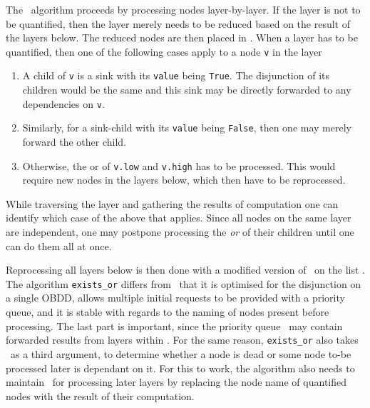 The \Exists\ algorithm proceeds by processing nodes layer-by-layer. If the layer
is not to be quantified, then the layer merely needs to be reduced based on the
result of the layers below. The reduced nodes are then placed in \ExistsLres.
When a layer has to be quantified, then one of the following cases apply to a
node \lstinline{v} in the layer

\begin{enumerate}
\item A child of \lstinline{v} is a sink with its \lstinline{value} being
  \lstinline{True}. The disjunction of its children would be the same and this
  sink may be directly forwarded to any dependencies on \lstinline{v}.

\item Similarly, for a sink-child with its \lstinline{value} being
  \lstinline{False}, then one may merely forward the other child.

\item Otherwise, the or of \lstinline{v.low} and \lstinline{v.high} has
  to be processed. This would require new nodes in the layers below, which
  then have to be reprocessed.
\end{enumerate}

While traversing the layer and gathering the results of computation one can
identify which case of the above that applies. Since all nodes on the same layer
are independent, one may postpone processing the \emph{or} of their children
until one can do them all at once.

Reprocessing all layers below is then done with a modified version of \Apply\ on
the list \ExistsLres. The algorithm \lstinline{exists_or} differs from \Apply\
that it is optimised for the disjunction on a single OBDD, allows multiple
initial requests to be provided with a priority queue, and it is stable with
regards to the naming of nodes present before processing. The last part is
important, since the priority queue \ExistsQdep\ may contain forwarded results
from layers within \ExistsLres. For the same reason, \lstinline{exists_or} also
takes \ExistsLforward\ as a third argument, to determine whether a node is dead
or some node to-be processed later is dependant on it. For this to work, the
algorithm also needs to maintain \ExistsLforward\ for processing later layers by
replacing the node name of quantified nodes with the result of their
computation.

